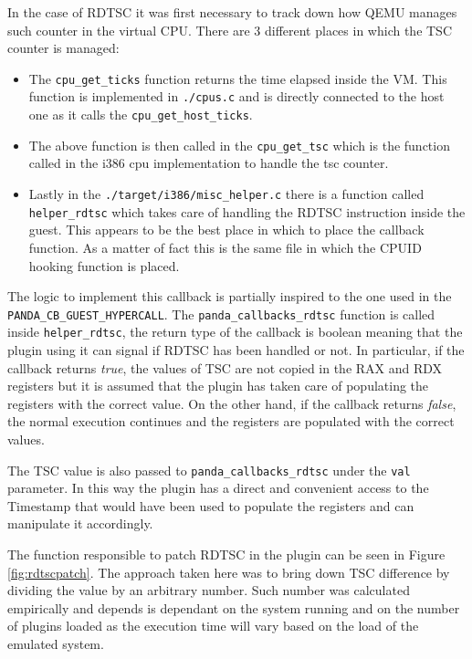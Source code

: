 In the case of RDTSC it was first necessary to track down how QEMU manages such counter in the virtual CPU. There are 3 different places in which the TSC counter is managed:

\begin{itemize}
    \item The \lstinline{cpu_get_ticks} function returns the time elapsed inside the VM. This function is implemented in \lstinline{./cpus.c} and is directly connected to the host one as it calls the \lstinline{cpu_get_host_ticks}.
    \item The above function is then called in the \lstinline{cpu_get_tsc} which is the function called in the i386 cpu implementation to handle the tsc counter. 
    \item Lastly in the \lstinline{./target/i386/misc_helper.c} there is a function called \lstinline{helper_rdtsc} which takes care of handling the RDTSC instruction inside the guest. This appears to be the best place in which to place the callback function. As a matter of fact this is the same file in which the CPUID hooking function is placed. 
\end{itemize}

The logic to implement this callback is partially inspired to the one used in the \lstinline{PANDA_CB_GUEST_HYPERCALL}. The \lstinline{panda_callbacks_rdtsc} function is called inside \lstinline{helper_rdtsc}, the return type of the callback is boolean meaning that the plugin using it can signal if RDTSC has been handled or not. In particular, if the callback returns \textit{true}, the values of TSC are not copied in the RAX and RDX registers but it is assumed that the plugin has taken care of populating the registers with the correct value. On the other hand, if the callback returns \textit{false}, the normal execution continues and the registers are populated with the correct values. 

The TSC value is also passed to \lstinline{panda_callbacks_rdtsc} under the \lstinline{val} parameter. In this way the plugin has a direct and convenient access to the Timestamp that would have been used to populate the registers and can manipulate it accordingly.

The function responsible to patch RDTSC in the plugin can be seen in Figure \ref{fig:rdtscpatch}. The approach taken here was to bring down TSC difference by dividing the value by an arbitrary number. Such number was calculated empirically and depends is dependant on the system running and on the number of plugins loaded as the execution time will vary based on the load of the emulated system.

